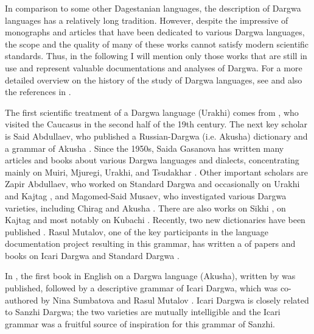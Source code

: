 In comparison to some other Dagestanian languages, the description of Dargwa languages has a relatively long tradition. However, despite the impressive  of monographs and articles that have been dedicated to various Dargwa languages, the scope and the quality of many of these works cannot satisfy modern scientific standards. Thus, in the following I will mention only those works that are still in use and represent valuable documentations and analyses of Dargwa. For a more detailed overview on the history of the study of Dargwa languages, see \citet{Magometov1983} and also the references in \citet{Temirbulatova2005}.

The first scientific treatment of a Dargwa language (Urakhi) comes from \citet{Uslar1892}, who visited the Caucasus in the second half of the 19th century. The next key scholar is Said Abdullaev, who published a Russian-Dargwa (i.e. Akusha) dictionary and a grammar of Akusha \citep{Abdullaev1950, Abdullaev1954}. Since the 1950s, Saida Gasanova has written many articles and books about various Dargwa languages and dialects, concentrating mainly on Muiri, Mjuregi, Urakhi, and Tsudakhar \citep[e.g.][]{Gasanova1961, Gasanova1971}. Other important scholars are Zapir Abdullaev, who worked on Standard Dargwa and occasionally on Urakhi and Kajtag \citep[e.g.][]{Abdullaev1961, Abdullaev1969, Abdullaev1971, Abdullaev1986, Abdullaev1993, AbdullaevEtAl2014}, and Magomed-Said Musaev, who investigated various Dargwa varieties, including Chirag and Akusha \citep[e.g.][]{Musaev1975, Musaev1978, Musaev1983, Musaev1980a, Musaev1980b}. There are also works on Sikhi \citep{Kadibagomedov1998}, on Kajtag \citep{Temirbulatova2005} and most notably on Kubachi \citep{Magometov1963}. Recently, two new dictionaries have been published \citep{Jusupov2005, Jusupov2009}. Rasul Mutalov, one of the key participants in the language documentation project resulting in this grammar, has written a  of papers and books on Icari Dargwa and Standard Dargwa \citep{Mutalov1992, Mutalov2002, Mutalov2018}.

In , the first book in English on a Dargwa language (Akusha), written by  was published, followed by a descriptive grammar of Icari Dargwa, which was co-authored by Nina Sumbatova and Rasul Mutalov \citep{Sumbatova.Mutalov2003}. Icari Dargwa is closely related to Sanzhi Dargwa; the two varieties are mutually intelligible and the Icari grammar was a fruitful source of inspiration for this grammar of Sanzhi.

